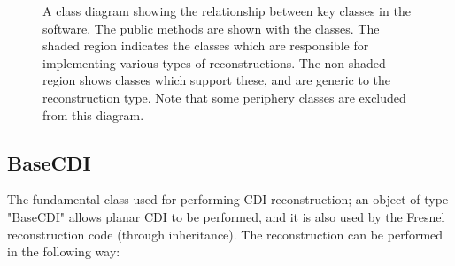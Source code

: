 \documentclass[]{nadia}
\def\name{NADIA}
\begin{document}
\begin{center}
\begin{figure}
    \caption[]{A class diagram showing the relationship between key classes in the software. The public methods are shown with the  classes. The shaded region indicates the classes which are responsible for implementing various types of reconstructions. The non-shaded region shows classes which support these, and are generic to the reconstruction type. Note that some periphery classes are excluded from this diagram.\label{fig:class_diagram}}
  \end{figure}
\end{center}


\subsection{BaseCDI}
The fundamental class used for performing CDI reconstruction; an
object of type "BaseCDI" allows planar CDI to be performed, and it is
also used by the Fresnel reconstruction code (through inheritance).
The reconstruction can be performed in the following way:
\end{document}
